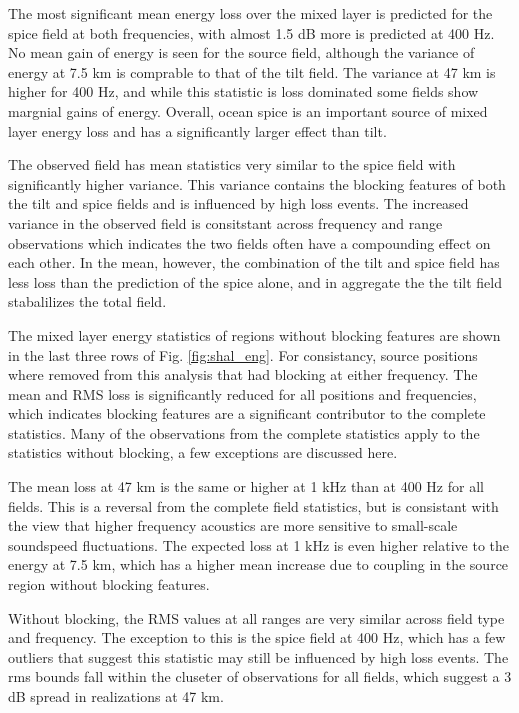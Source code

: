\documentclass[preprint,NumberedRefs]{JASA}
\begin{document}
The most significant mean energy loss over the mixed layer is predicted for the spice field at both frequencies, with almost 1.5 dB more is predicted at 400 Hz. No mean gain of energy is seen for the source field, although the variance of energy at 7.5 km is comprable to that of the tilt field. The variance at 47 km is higher for 400 Hz, and while this statistic is loss dominated some fields show margnial gains of energy. Overall, ocean spice is an important source of mixed layer energy loss and has a significantly larger effect than tilt.

The observed field has mean statistics very similar to the spice field with significantly higher variance. This variance contains the blocking features of both the tilt and spice fields and is influenced by high loss events. The increased variance in the observed field is consitstant across frequency and range observations which indicates the two fields often have a compounding effect on each other. In the mean, however, the combination of the tilt and spice field has less loss than the prediction of the spice alone, and in aggregate the the tilt field stabalilizes the total field.

The mixed layer energy statistics of regions without blocking features are shown in the last three rows of Fig. \ref{fig:shal_eng}. For consistancy, source positions where removed from this analysis that had blocking at either frequency. The mean and RMS loss is significantly reduced for all positions and frequencies, which indicates blocking features are a significant contributor to the complete statistics. Many of the observations from the complete statistics apply to the statistics without blocking, a few exceptions are discussed here.

The mean loss at 47 km is the same or higher at 1 kHz than at 400 Hz for all fields. This is a reversal from the complete field statistics, but is consistant with the view that higher frequency acoustics are more sensitive to small-scale soundspeed fluctuations. The expected loss at 1 kHz is even higher relative to the energy at 7.5 km, which has a higher mean increase due to coupling in the source region without blocking features.

Without blocking, the RMS values at all ranges are very similar across field type and frequency. The exception to this is the spice field at 400 Hz, which has a few outliers that suggest this statistic may still be influenced by high loss events. The rms bounds fall within the cluseter of observations for all fields, which suggest a 3 dB spread in realizations at 47 km.
\end{document}
